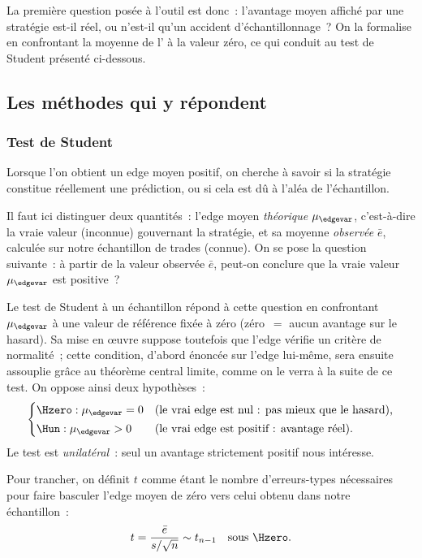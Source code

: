La première question posée à l'outil est donc~: l'avantage moyen affiché
par une stratégie est-il réel, ou n'est-il qu'un accident
d'échantillonnage~? On la formalise en confrontant la moyenne de
l'\edgevar{} à la valeur zéro, ce qui conduit au test de Student présenté
ci-dessous.

\subsection{Les méthodes qui y répondent}

\subsubsection*{Test de Student}

Lorsque l'on obtient un edge moyen positif, on cherche à savoir si la
stratégie constitue réellement une prédiction, ou si cela est dû à l'aléa
de l'échantillon.

Il faut ici distinguer deux quantités~: l'edge moyen
\emph{théorique} \(\mu_{\edgevar}\), c'est-à-dire la vraie valeur (inconnue)
gouvernant la stratégie, et sa moyenne
\emph{observée} \(\bar e\), calculée sur notre échantillon de trades
(connue). On se pose la question suivante~: à partir de la valeur observée
\(\bar e\), peut-on conclure que la vraie valeur \(\mu_{\edgevar}\) est
positive~?

Le test de Student à un échantillon répond à cette question en confrontant
\(\mu_{\edgevar}\) à une valeur de référence fixée à zéro (zéro~$=$ aucun
avantage sur le hasard). Sa mise en \oe uvre suppose toutefois que l'edge
vérifie un critère de normalité~; cette condition, d'abord énoncée sur
l'edge lui-même, sera ensuite assouplie grâce au théorème central limite,
comme on le verra à la suite de ce test. On oppose ainsi deux
hypothèses~:
\[
  \begin{cases}
    \Hzero : \mu_{\edgevar} = 0 & \text{(le vrai edge est nul : pas mieux que le hasard),}\\[2pt]
    \Hun : \mu_{\edgevar} > 0 & \text{(le vrai edge est positif : avantage réel).}
  \end{cases}
\]
Le test est \emph{unilatéral}~: seul un avantage strictement positif nous
intéresse.

Pour trancher, on définit \(t\) comme étant le nombre d'erreurs-types
nécessaires pour faire basculer l'edge moyen de zéro vers celui obtenu
dans notre échantillon~:
\[
  t = \frac{\bar e}{s/\sqrt{n}} \sim t_{n-1} \quad\text{sous } \Hzero .
\]


